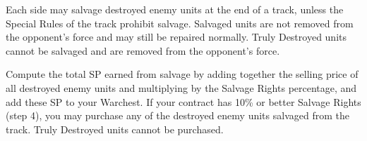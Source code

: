 Each side may salvage destroyed enemy units at the end of a track, unless the Special Rules of the track prohibit salvage.
Salvaged units are not removed from the opponent's force and may still be repaired normally.
Truly Destroyed units cannot be salvaged and are removed from the opponent's force.

Compute the total SP earned from salvage by adding together the selling price of all destroyed enemy units and multiplying by the Salvage Rights percentage, and add these SP to your Warchest.
If your contract has 10\% or better Salvage Rights (step 4), you may purchase any of the destroyed enemy units salvaged from the track.
Truly Destroyed units cannot be purchased.
